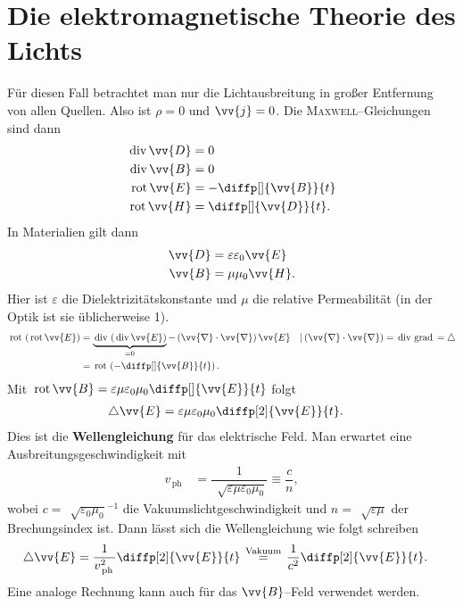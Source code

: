 \documentclass[a4paper,12pt]{article}
\numberwithin{equation}{section}
\begin{document}
\section{Die elektromagnetische Theorie des Lichts}
Für diesen Fall betrachtet man nur die Lichtausbreitung in großer Entfernung von allen Quellen. Also ist $\rho =0$ und $\vv{j}=0$. Die \textsc{Maxwell}--Gleichungen sind dann
\begin{align}
        \,\text{div}\,\vv{D}&=0\\
        \,\text{div}\,\vv{B}&=0\\
        \,\text{rot}\,\vv{E}&=-\diffp[]{\vv{B}}{t}\\
        \,\text{rot}\,\vv{H}&=\diffp[]{\vv{D}}{t}
.\end{align}
In Materialien gilt dann
\begin{align} 
        \vv{D}&=\varepsilon \varepsilon _0\vv{E}\\
        \vv{B}&=\mu \mu _0\vv{H}
.\end{align} 
Hier ist $\varepsilon $ die Dielektrizitätskonstante und $\mu $ die relative Permeabilität (in der Optik ist sie üblicherweise 1). \\\indent
\begin{align} 
        \,\text{rot}\,\left(\,\text{rot}\,\vv{E}\right)&=\underbrace{\,\text{div}\,\left(\,\text{div}\,\vv{E}\right)}_{=0}-\left(\vv{\nabla }\cdot \vv{\nabla }\right)\vv{E}&&|\left(\vv{\nabla }\cdot \vv{\nabla }\right)=\,\text{div}\,\,\text{grad}\,=\triangle\\
                                                       &=\,\text{rot}\,\left(-\diffp[]{\vv{B}}{t}\right)
.\end{align} 
Mit $\,\text{rot}\,\vv{B}=\varepsilon\mu \varepsilon _0 \mu _0\diffp[]{\vv{E}}{t}$ folgt
\begin{align} 
        \triangle \vv{E}&=\varepsilon \mu \varepsilon _0\mu _0\diffp[2]{\vv{E}}{t}
.\end{align} 
Dies ist die \textbf{Wellengleichung} für das elektrische Feld. Man erwartet eine Ausbreitungsgeschwindigkeit mit
\begin{align} 
        v_{\,\text{ph}\,}&=\dfrac{1}{\,\sqrt[]{\varepsilon \mu \varepsilon _0\mu _0}}\equiv \dfrac{c}{n}
,\end{align} 
wobei $c=\,\sqrt[]{\varepsilon _0\mu _0}^{-1}$ die Vakuumslichtgeschwindigkeit und $n=\,\sqrt[]{\varepsilon \mu }$ der Brechungsindex ist. Dann lässt sich die Wellengleichung wie folgt schreiben
\begin{align} 
        \triangle \vv{E}&=\dfrac{1}{v_{\,\text{ph}\,}^2}\diffp[2]{\vv{E}}{t}\stackrel{\,\text{Vakuum}\,}{=}\dfrac{1}{c^2}\diffp[2]{\vv{E}}{t}
.\end{align} 
Eine analoge Rechnung kann auch für das $\vv{B}$--Feld verwendet werden.\\\indent
\end{document}
